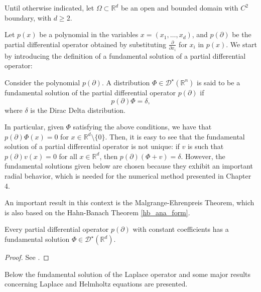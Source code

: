 \label{chap:problem_introduction}

Until otherwise indicated, let \(\Omega \subset \mathbb{R}^d\) be an open and bounded domain with \(C^2\) boundary, with $d \geq 2$.

Let \(p(x)\) be a polynomial in the variables \(x=(x_1,\dots,x_d)\), and \(p(\partial)\) be the partial differential operator obtained by substituting \(\frac{\partial}{\partial x_i}\) for \(x_i\) in \(p(x)\). We start by introducing the definition of a fundamental solution of a partial differential operator:

\begin{definition}
    Consider the polynomial \(p(\partial)\). A distribution \(\Phi \in \mathcal{D}^\star(\mathbb{R}^n)\) is said to be a fundamental solution of the partial differential operator \(p(\partial)\) if
    \[
        p(\partial) \Phi = \delta,
    \]
    where \(\delta\) is the Dirac Delta distribution.
\end{definition}

In particular, given \(\Phi\) satisfying the above conditions, we have that \(p(\partial)\Phi(x) = 0\) for \(x \in \mathbb{R}^d\setminus \{0\}\). Then, it is easy to see that the fundamental solution of a partial differential operator is not unique: if \(v\) is such that \(p(\partial) v(x) = 0\) for all \(x \in \mathbb{R}^d\), then \(p(\partial) (\Phi + v) = \delta\). However, the fundamental solutions given below are chosen because they exhibit an important radial behavior, which is needed for the numerical method presented in Chapter 4.

An important result in this context is the Malgrange-Ehrenpreis Theorem, which is also based on the Hahn-Banach Theorem \ref{hb_ana_form}.

\begin{theorem}\label{malgrange-ehrenpreis}
    Every partial differential operator $p(\partial)$ with constant coefficients has a fundamental solution $\Phi \in \mathcal{D}^\star(\mathbb{R}^d)$.
\end{theorem}
\begin{proof}
    See \cite{reed1975ii}.
\end{proof}
Below the fundamental solution of the Laplace operator and some major results concerning Laplace and Helmholtz equations are presented. 

